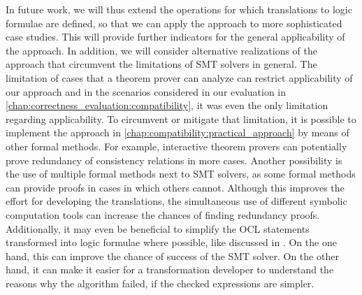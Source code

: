In future work, we will thus extend the operations for which translations to logic formulae are defined, so that we can apply the approach to more sophisticated case studies.
This will provide further indicators for the general applicability of the approach.
%
In addition, we will consider alternative realizations of  the approach that circumvent the limitations of \gls{SMT} solvers in general.
The limitation of cases that a theorem prover can analyze can restrict applicability of our approach and in the scenarios considered in our evaluation in \autoref{chap:correctness_evaluation:compatibility}, it was even the only limitation regarding applicability.
To circumvent or mitigate that limitation, it is possible to implement the approach in \autoref{chap:compatibility:practical_approach} by means of other formal methods. 
For example, interactive theorem provers can potentially prove redundancy of consistency relations in more cases. 
Another possibility is the use of multiple formal methods next to \gls{SMT} solvers, as some formal methods can provide proofs in cases in which others cannot.
Although this improves the effort for developing the translations, the simultaneous use of different symbolic computation tools can increase the chances of finding redundancy proofs.
Additionally, it may even be beneficial to simplify the \gls{OCL} statements transformed into logic formulae where possible, like discussed in \textcite{cuadrado2019OclOptimization-SoSym}.
On the one hand, this can improve the chance of success of the \gls{SMT} solver.
On the other hand, it can make it easier for a transformation developer to understand the reasons why the algorithm failed, if the checked expressions are simpler.



